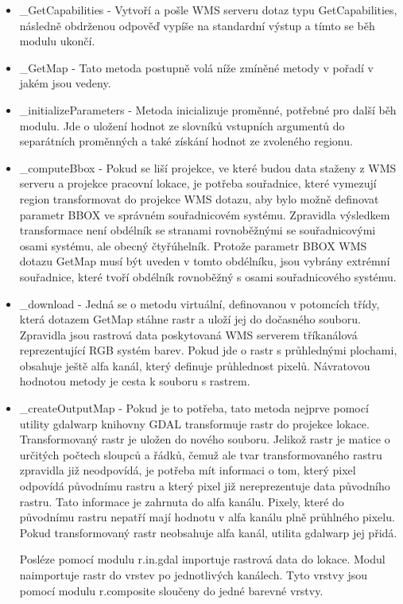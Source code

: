 \documentclass[a4paper,12pt]{article}
\begin{document}
\begin{itemize}
  \item \_GetCapabilities - Vytvoří a pošle WMS serveru dotaz typu GetCapabilities, následně obdrženou odpověď vypíše na standardní výstup a tímto se běh modulu ukončí. 
  \item \_GetMap - Tato metoda postupně volá níže zmíněné metody v pořadí v jakém jsou vedeny. 
  \item \_initializeParameters - Metoda inicializuje proměnné, potřebné pro další běh modulu. Jde o uložení hodnot ze slovníků vstupních argumentů do separátních proměnných a také získání hodnot ze zvoleného regionu.
  \item \_computeBbox - Pokud se liší projekce, ve které budou data staženy z WMS serveru a projekce pracovní lokace, je potřeba souřadnice, které vymezují region transformovat do projekce WMS dotazu, aby bylo možně definovat parametr BBOX ve správném souřadnicovém systému.
                        Zpravidla výsledkem transformace není obdélník se stranami rovnoběžnými se souřadnicovými osami systému, ale obecný čtyřúhelník. Protože parametr BBOX WMS dotazu GetMap  musí být uveden  v tomto obdélníku, jsou vybrány extrémní souřadnice, které tvoří obdélník rovnoběžný s osami souřadnicového systému.      
  \item \_download - Jedná se o metodu virtuální, definovanou v potomcích třídy, která dotazem GetMap stáhne rastr a uloží jej do dočasného souboru. Zpravidla jsou rastrová data poskytovaná WMS serverem tříkanálová reprezentující RGB systém barev. Pokud jde o rastr s průhlednými plochami, obsahuje ještě alfa kanál, který definuje průhlednost pixelů. Návratovou hodnotou metody je cesta k souboru s rastrem.
  \item \_createOutputMap - Pokud je to potřeba, tato metoda nejprve pomocí utility gdalwarp knihovny GDAL transformuje rastr do projekce lokace. Transformovaný rastr je uložen do nového souboru. 
                            Jelikož rastr je matice o určitých počtech sloupců a řádků, čemuž ale tvar transformovaného rastru zpravidla již neodpovídá, je potřeba mít informaci o tom, který pixel odpovídá původnímu rastru 
                            a který pixel již nereprezentuje data původního rastru. Tato informace je zahrnuta do alfa kanálu. Pixely, které do původnímu rastru nepatří mají hodnotu v alfa kanálu plně průhlného pixelu.  Pokud transformovaný rastr neobsahuje alfa kanál, utilita gdalwarp jej přidá.

Posléze pomocí modulu r.in.gdal importuje rastrová data do lokace.
Modul naimportuje rastr do vrstev po jednotlivých kanálech. Tyto vrstvy jsou pomocí modulu  r.composite sloučeny do jedné barevné vrstvy. 


\end{itemize}
\end{document}
